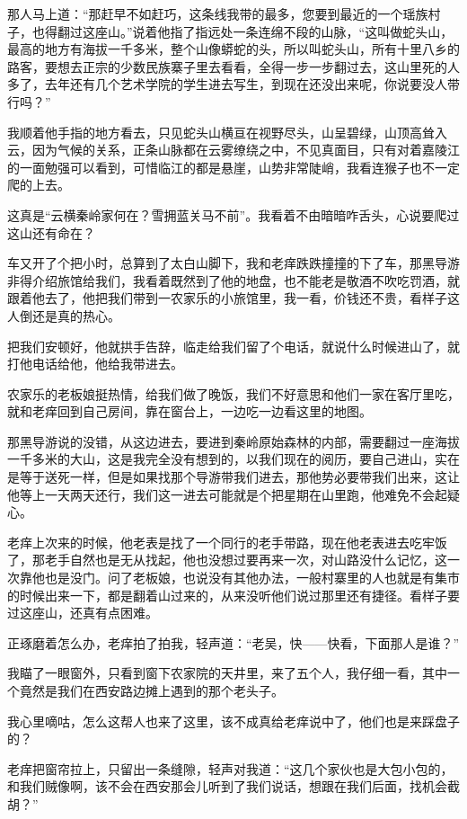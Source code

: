 那人马上道：“那赶早不如赶巧，这条线我带的最多，您要到最近的一个瑶族村子，也得翻过这座山。”说着他指了指远处一条连绵不段的山脉，“这叫做蛇头山，最高的地方有海拔一千多米，整个山像蟒蛇的头，所以叫蛇头山，所有十里八乡的路客，要想去正宗的少数民族寨子里去看看，全得一步一步翻过去，这山里死的人多了，去年还有几个艺术学院的学生进去写生，到现在还没出来呢，你说要没人带行吗？”

我顺着他手指的地方看去，只见蛇头山横亘在视野尽头，山呈碧绿，山顶高耸入云，因为气候的关系，正条山脉都在云雾缭绕之中，不见真面目，只有对着嘉陵江的一面勉强可以看到，可惜临江的都是悬崖，山势非常陡峭，我看连猴子也不一定爬的上去。

这真是“云横秦岭家何在？雪拥蓝关马不前”。我看着不由暗暗咋舌头，心说要爬过这山还有命在？

车又开了个把小时，总算到了太白山脚下，我和老痒跌跌撞撞的下了车，那黑导游非得介绍旅馆给我们，我看着既然到了他的地盘，也不能老是敬酒不吹吃罚酒，就跟着他去了，他把我们带到一农家乐的小旅馆里，我一看，价钱还不贵，看样子这人倒还是真的热心。

把我们安顿好，他就拱手告辞，临走给我们留了个电话，就说什么时候进山了，就打他电话给他，他给我带进去。

农家乐的老板娘挺热情，给我们做了晚饭，我们不好意思和他们一家在客厅里吃，就和老痒回到自己房间，靠在窗台上，一边吃一边看这里的地图。

那黑导游说的没错，从这边进去，要进到秦岭原始森林的内部，需要翻过一座海拔一千多米的大山，这是我完全没有想到的，以我们现在的阅历，要自己进山，实在是等于送死一样，但是如果找那个导游带我们进去，那他势必要带我们出来，这让他等上一天两天还行，我们这一进去可能就是个把星期在山里跑，他难免不会起疑心。

老痒上次来的时候，他老表是找了一个同行的老手带路，现在他老表进去吃牢饭了，那老手自然也是无从找起，他也没想过要再来一次，对山路没什么记忆，这一次靠他也是没门。问了老板娘，也说没有其他办法，一般村寨里的人也就是有集市的时候出来一下，都是翻着山过来的，从来没听他们说过那里还有捷径。看样子要过这座山，还真有点困难。

正琢磨着怎么办，老痒拍了拍我，轻声道：“老吴，快——快看，下面那人是谁？”

我瞄了一眼窗外，只看到窗下农家院的天井里，来了五个人，我仔细一看，其中一个竟然是我们在西安路边摊上遇到的那个老头子。

我心里嘀咕，怎么这帮人也来了这里，该不成真给老痒说中了，他们也是来踩盘子的？

老痒把窗帘拉上，只留出一条缝隙，轻声对我道：“这几个家伙也是大包小包的，和我们贼像啊，该不会在西安那会儿听到了我们说话，想跟在我们后面，找机会截胡？”

